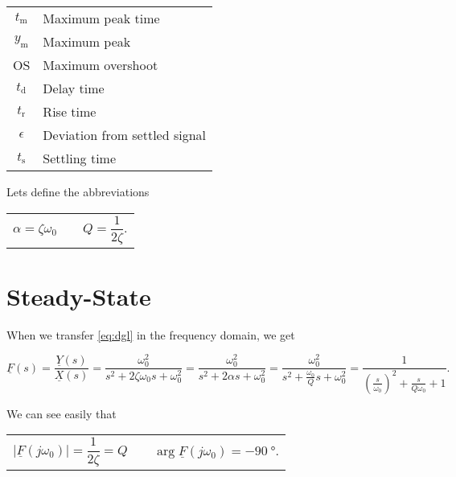 \documentclass{article}[11pt]
\begin{document}
\begin{table}[H]
\begin{tabular}{cl}
$t_{\mathrm{m}}$      & Maximum peak time                        \\ 
$y_{\mathrm{m}}$      & Maximum peak                             \\ 
OS                    & Maximum overshoot                        \\ 
$t_{\mathrm{d}}$      & Delay time                               \\ 
$t_{\mathrm{r}}$      & Rise time                                \\ 
$\epsilon$            & Deviation from settled signal            \\
$t_{\mathrm{s}}$      & Settling time                            \\ \toprule
\end{tabular}
\label{tab:variables}
\end{table}

Lets define the abbreviations
\begin{center}
\begin{tabular}{p{4cm}p{2cm}p{4cm}}
  \begin{equation}
    \alpha = \zeta \omega_0
  \end{equation}
  &
  &
  \begin{equation}
    Q =\frac{1}{2\zeta}.
  \end{equation}
\end{tabular}
\end{center}

\newpage

\section{Steady-State}

When we transfer \eqref{eq:dgl} in the frequency domain, we get

\begin{equation}\label{eq:fs}
\underline{F}(s) = \frac{\underline{Y}(s)}{\underline{X}(s)} 
                 = \frac{\omega_0^2}{s^2 + 2 \zeta \omega_0 s + \omega_0^2 }
                 = \frac{\omega_0^2}{s^2 + 2 \alpha s + \omega_0^2 }
                 = \frac{\omega_0^2}{s^2 + \frac{\omega_0}{Q} s + \omega_0^2 }
                 = \frac{1}{\left(\frac{s}{\omega_0}\right)^2 + \frac{s}{Q\omega_0} + 1}
.
\end{equation}

We can see easily that
\begin{center}
\begin{tabular}{p{5cm}p{2cm}p{5cm}}
  \begin{equation}
    \left|\underline{F}(j\omega_0)\right| = \frac{1}{2 \zeta} = Q
  \end{equation}
  &
  &
  \begin{equation}\label{eq:argf0}
    \arg{\underline{F}(j\omega_0)} = -\SI{90}{\degree}.
  \end{equation}
\end{tabular}
\end{center}
\end{document}
